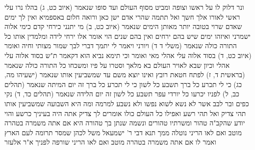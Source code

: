 \documentclass[12pt, openany]{book}
\begin{document}
{ונר דלוק לו על ראשו וצופה ומביט מסוף העולם ועד סופו שנאמר  (איוב כט, ג) בהלו נרו עלי ראשי לאורו אלך חשך  ואל תתמה שהרי אדם ישן כאן ורואה חלום באספמיא 
ואין לך ימים שאדם שרוי בטובה יותר מאותן הימים שנאמר  (איוב כט, ב) מי יתנני כירחי קדם כימי אלוה ישמרני ואיזהו ימים שיש בהם ירחים ואין בהם שנים הוי אומר  אלו ירחי לידה 
ומלמדין אותו כל התורה כולה שנאמר  (משלי ד ד) ויורני ויאמר לי יתמך דברי לבך שמור מצותי וחיה ואומר  (איוב כט, ד) בסוד אלוה עלי אהלי 
מאי ואומר  וכי תימא נביא הוא דקאמר ת"ש  בסוד אלוה עלי אהלי 
וכיון שבא לאויר העולם בא מלאך וסטרו על פיו ומשכחו כל התורה כולה שנאמר  (בראשית ד, ז) לפתח חטאת רובץ 
ואינו יוצא משם עד שמשביעין אותו שנאמר  (ישעיהו מה, כג) כי לי תכרע כל ברך תשבע כל לשון כי לי תכרע כל ברך זה יום המיתה שנאמר  (תהלים כב, ל) לפניו יכרעו כל יורדי עפר תשבע כל לשון זה יום הלידה שנאמר  (תהלים כד, ד) נקי כפים ובר לבב אשר לא נשא לשוא נפשו ולא נשבע למרמה
ומה היא השבועה שמשביעין אותו תהי צדיק ואל תהי רשע ואפילו כל העולם כולו אומרים לך  צדיק אתה היה בעיניך כרשע  והוי יודע שהקב"ה טהור ומשרתיו טהורים ונשמה שנתן בך טהורה היא אם אתה משמרה בטהרה מוטב ואם לאו הריני נוטלה ממך 
תנא דבי ר' ישמעאל  משל לכהן שמסר תרומה לעם הארץ ואמר לו  אם אתה משמרה בטהרה מוטב ואם לאו הריני שורפה לפניך 
א"ר אלעזר}
\end{document}
